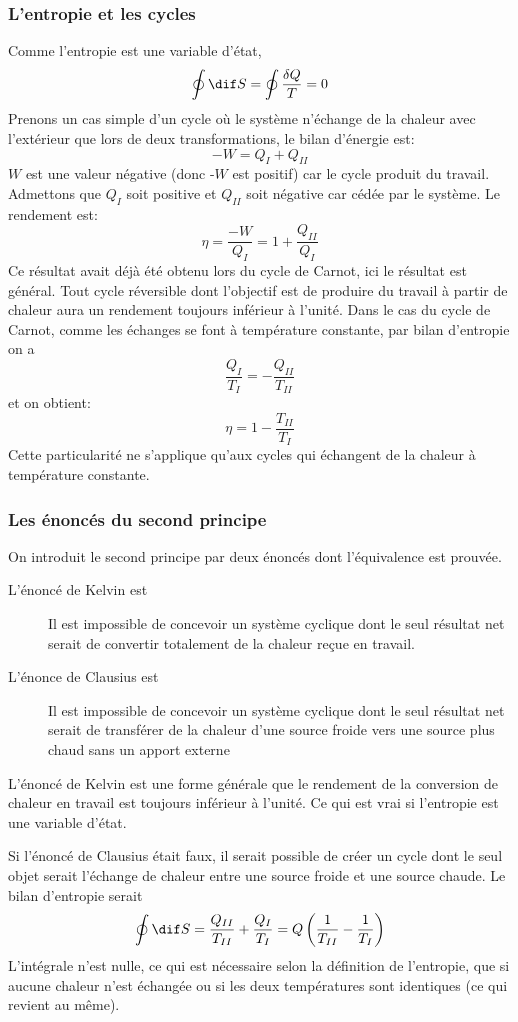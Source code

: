 \subsubsection{L'entropie et les cycles}
Comme l'entropie est une variable d'état,
\[ \oint \dif S = \oint \frac{\delta Q}{T} = 0 \]
Prenons un cas simple d'un cycle où le système n'échange de la chaleur
avec l'extérieur que lors de deux transformations, le bilan d'énergie est:
\[ -W = Q_I+Q_{II} \]
$W$ est une valeur négative (donc -$W$ est positif)
car le cycle produit du travail.
Admettons que $Q_I$ soit positive et $Q_{II}$
soit négative car cédée par le système.
Le rendement est:
\[  \eta = \frac{-W}{Q_I} = 1+\frac{Q_{II}}{Q_I} \]
Ce résultat avait déjà été obtenu lors du cycle de Carnot,
ici le résultat est général.
Tout cycle réversible dont l'objectif est de produire du travail
à partir de chaleur aura un rendement toujours inférieur à l'unité.
Dans le cas du cycle de Carnot, comme les échanges se font
à température constante, par bilan d'entropie on a
\[ \frac{Q_I}{T_I} = - \frac{Q_{II}}{T_{II}} \]
et on obtient:
\[ \eta = 1 - \frac {T_{II}}{T_I} \]
Cette particularité ne s'applique qu'aux cycles qui
échangent de la chaleur à température constante.

\subsubsection{Les énoncés du second principe}
On introduit le second principe par deux énoncés dont l'équivalence est prouvée.

\begin{description}
  \item[L'énoncé de Kelvin est]
    Il est impossible de concevoir un système cyclique dont le seul résultat net
    serait de convertir totalement de la chaleur reçue en travail.
  \item[L'énonce de Clausius est]
    Il est impossible de concevoir un système cyclique dont
    le seul résultat net serait de transférer de la chaleur
    d'une source froide vers une source plus chaud sans un apport externe
\end{description}
L'énoncé de Kelvin est une forme générale que le rendement de la conversion
de chaleur en travail est toujours inférieur à l'unité.
Ce qui est vrai si l'entropie est une variable d'état.

Si l'énoncé de Clausius était faux, il serait possible de créer
un cycle dont le seul objet serait l'échange de chaleur
entre une source froide et une source chaude.
Le bilan d'entropie serait
\[ \oint \dif S = \frac{Q_{II}}{T_{II}}+\frac{Q_I}{T_I} =
Q\left(\frac 1 {T_{II}} - \frac 1 {T_I}\right) \]
L'intégrale n'est nulle,
ce qui est nécessaire selon la définition de l'entropie,
que si aucune chaleur n'est échangée ou si les deux températures sont
identiques (ce qui revient au même).

